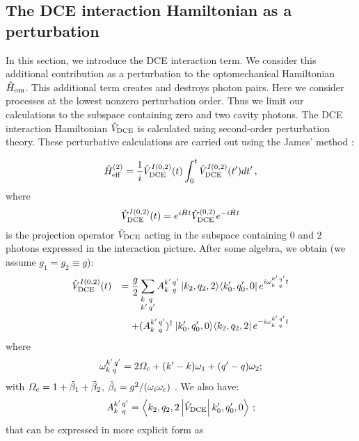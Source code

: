 \documentclass[aps,pra,twocolumn,floatfix,longbibliography, superscriptaddress]{revtex4-1}
\newcommand{\ketbra}[2]{\left| #1 \rangle \langle #2 \right|}
\newcommand{\brakket}[3]{\left\langle #1\left| #2 \right| #3\right\rangle}
\newcommand{\nn}{\nonumber}
\newcommand{\be}{\begin{equation}}
\newcommand{\ee}{\end{equation}}
\newcommand{\bea}{\begin{eqnarray}}
\newcommand{\eea}{\end{eqnarray}}
\begin{document}
\subsection{The DCE interaction Hamiltonian as a perturbation}
\label{Subsec:B}
In this section, we introduce the DCE interaction term. We consider this additional contribution  as a perturbation to the optomechanical Hamiltonian $\hat H_{\rm om}$. This additional term creates and destroys  photon pairs. Here we consider processes at the lowest nonzero perturbation order. Thus we limit our calculations to the subspace containing zero and two cavity photons.
The DCE interaction Hamiltonian $\hat V_{\rm DCE}$ is calculated  using second-order perturbation theory. These perturbative calculations are carried out using the James'  method \cite{ Shao2017}:

\be\label{H2}
\hat H^{(2)}_{\rm eff}= \frac{1}{i}\hat V^{I(0,2)}_{\rm DCE}(t)\int_0^t
\hat V^{I(0,2)}_{\rm DCE}(t^\prime)dt^\prime\, ,
\ee
where $$ \hat V^{I(0,2)}_{\rm DCE}(t)= e^{i\hat H t} \hat V^{(0,2)}_{\rm DCE} e^{-i\hat H t}$$ 
is the projection  operator $\hat V_{\rm DCE}$ acting in the  subspace containing $0$ and $2$ photons expressed in the interaction picture.
After some algebra, we obtain (we assume  $g_1 = g_2 \equiv g$):
\bea\label{VI}
\hat V^{I(0,2)}_{\rm DCE}(t)&&=\frac{ g}{2} \sum\limits_{\substack{k^{\phantom{\prime}}\, q^{\phantom{\prime}} \\ \nn k^\prime\,q^\prime}}
A^{k^\prime\,q^\prime}_{k^{\phantom{\prime}}\, q^{\phantom{\prime}}}
\ketbra{k_2,q_2,2}{k_0^\prime,q_0^\prime,0} e^{i\omega^{k^\prime\,q^\prime}_{k^{\phantom{\prime}}\, q^{\phantom{\prime}}}t}\\ &&+
(A^{k^\prime\,q^\prime}_{k^{\phantom{\prime}}\, q^{\phantom{\prime}}})^\dag
\ketbra{k_0^\prime,q_0^\prime,0}{k_2,q_2,2} e^{-i\omega^{k^\prime\,q^\prime}_{k^{\phantom{\prime}}\, q^{\phantom{\prime}}}t}
\eea
where 
\be
\omega^{k^\prime\,q^\prime}_{{k^{\phantom{\prime}}} q^{\phantom{\prime}}}=
2\Omega_{\rm c}+
(k^\prime-k)\omega_{1}
+(q^\prime-q)\omega_{2};
\ee
with $\Omega_{\rm c}= 1+\tilde \beta_1+\tilde \beta_2$, $\tilde\beta_i=g^2/(\omega_i \omega_{\rm c})$
.
We also have: 
$$
A^{k^\prime\,q^\prime}_{k^{\phantom{\prime}}\, q^{\phantom{\prime}}}=\brakket{k_2,q_2,2}{\hat V_{\rm DCE}}{k^\prime_0,q^\prime_0,0}\,;
$$
that can be expressed in more explicit form as
\end{document}
